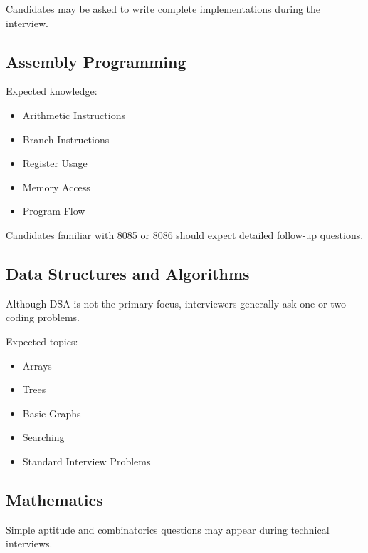 \documentclass[11pt,a4paper]{article}
\begin{document}
Candidates may be asked to write complete implementations during the interview.


\subsection{Assembly Programming}

Expected knowledge:

\begin{itemize}
	\item Arithmetic Instructions
	\item Branch Instructions
	\item Register Usage
	\item Memory Access
	\item Program Flow
\end{itemize}

Candidates familiar with 8085 or 8086 should expect detailed follow-up questions.


\subsection{Data Structures and Algorithms}

Although DSA is not the primary focus, interviewers generally ask one or two coding problems.

Expected topics:

\begin{itemize}
	\item Arrays
	\item Trees
	\item Basic Graphs
	\item Searching
	\item Standard Interview Problems
\end{itemize}


\subsection{Mathematics}

Simple aptitude and combinatorics questions may appear during technical interviews.

\end{document}
